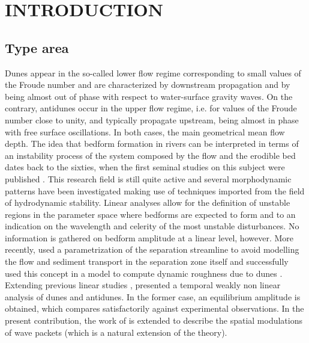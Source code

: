 \documentclass[12pt,a4paper,twocolumn,fleqn]{narms}
\begin{document}
\maketitle

\section{INTRODUCTION}

\subsection{Type area}

Dunes appear in the so-called lower flow regime corresponding to
small values of the Froude number and are characterized by
downstream propagation and by being almost out of phase with
respect to water-surface gravity waves. On the contrary, antidunes
occur in the upper flow regime, i.e. for values of the Froude
number close to unity, and typically propagate upstream, being
almost in phase with free surface oscillations. In both cases, the
main geometrical mean flow depth. The idea that bedform formation
in rivers can be interpreted in terms of an instability process of
the system composed by the flow and the erodible bed dates back to
the sixties, when the first seminal studies on this subject were
published \cite{ke63,re65}. This research field is still quite
active \cite{as02} and several morphodynamic patterns have been
investigated making use of techniques imported from the field of
hydrodynamic stability. Linear analyses allow for the definition
of unstable regions in the parameter space where bedforms are
expected to form \cite[among others]{en70,fr74,cf00} and to an
indication on the wavelength and celerity of the most unstable
disturbances. No information is gathered on bedform amplitude at a
linear level, however. More recently,  used a
parametrization of the separation streamline to avoid modelling
the flow and sediment transport in the separation zone itself and
successfully used this concept in a model to compute dynamic
roughness due to dunes . Extending previous linear
studies \cite{co04,cs05},  presented a temporal weakly
non linear analysis of dunes and antidunes.  In the former case,
an equilibrium amplitude is obtained, which compares
satisfactorily against experimental observations. In the present
contribution, the work of  is extended to describe the
spatial modulations of wave packets (which is a natural extension
of the theory).
\end{document}

